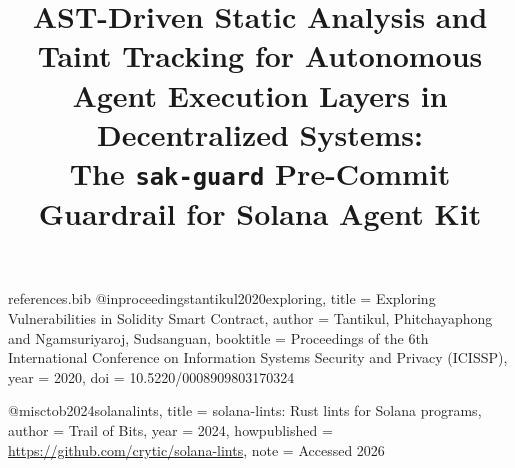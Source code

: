 \begin{filecontents*}{references.bib}
@inproceedings{tantikul2020exploring,
  title     = {Exploring Vulnerabilities in Solidity Smart Contract},
  author    = {Tantikul, Phitchayaphong and Ngamsuriyaroj, Sudsanguan},
  booktitle = {Proceedings of the 6th International Conference on Information
               Systems Security and Privacy ({ICISSP})},
  year      = {2020},
  doi       = {10.5220/0008909803170324}
}

@misc{tob2024solanalints,
  title        = {{solana-lints}: {Rust} lints for {Solana} programs},
  author       = {{Trail of Bits}},
  year         = {2024},
  howpublished = {\url{https://github.com/crytic/solana-lints}},
  note         = {Accessed 2026}
}
\end{filecontents*}

\documentclass[conference]{IEEEtran}
\IEEEoverridecommandlockouts

\usepackage{cite}
\usepackage{amsmath,amssymb,amsfonts}
\usepackage{algorithmic}
\usepackage{graphicx}
\usepackage{textcomp}
\usepackage{xcolor}
\usepackage{booktabs}
\usepackage{url}
\usepackage[hidelinks]{hyperref}
\usepackage{microtype}

\setlength{\emergencystretch}{2em}



\def\BibTeX{{\rm B\kern-.05em{\sc i\kern-.025em b}\kern-.08em
    T\kern-.1667em\lower.7ex\hbox{E}\kern-.125emX}}



\title{AST-Driven Static Analysis and Taint Tracking for Autonomous Agent
Execution Layers in Decentralized Systems:\\
The \texttt{sak-guard} Pre-Commit Guardrail for \mbox{Solana} Agent Kit}

\author{
}

\maketitle

